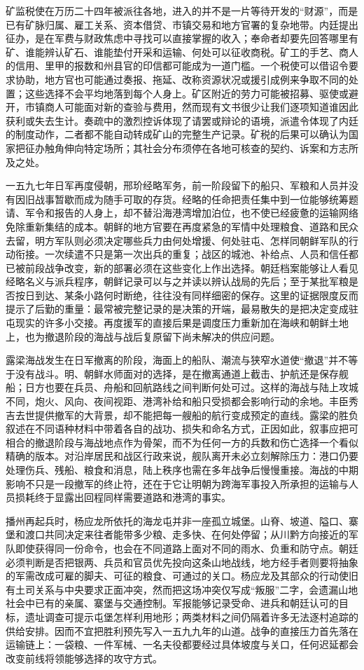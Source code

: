 矿监税使在万历二十四年被派往各地，进入的并不是一片等待开发的“财源”，而是已有矿脉归属、雇工关系、资本借贷、市镇交易和地方官署的复杂地带。内廷提出征办，是在军费与财政焦虑中寻找可以直接掌握的收入；奉命者却要先回答哪里有矿、谁能辨认矿石、谁能垫付开采和运输、何处可以征收商税。矿工的手艺、商人的信用、里甲的报数和州县官的印信都可能成为一道门槛。一个税使可以借诏令要求协助，地方官也可能通过奏报、拖延、改称资源状况或援引成例来争取不同的处置；这些选择不会平均地落到每个人身上。矿区附近的劳力可能被招募、驱使或避开，市镇商人可能面对新的查验与费用，然而现有文书很少让我们逐项知道谁因此获利或失去生计。奏疏中的激烈控诉体现了请罢或辩论的语境，派遣令体现了内廷的制度动作，二者都不能自动转成矿山的完整生产记录。矿税的后果可以确认为国家把征办触角伸向特定场所；其社会分布须停在各地可核查的契约、诉案和方志所及之处。

一五九七年日军再度侵朝，邢玠经略军务，前一阶段留下的船只、军粮和人员并没有因旧战事暂歇而成为随手可取的存货。经略的任命把责任集中到一位能够统筹题请、军令和报告的人身上，却不替沿海港湾增加泊位，也不使已经疲惫的运输网络免除重新集结的成本。朝鲜的地方官要在再度紧急的军情中处理粮食、道路和民众去留，明方军队则必须决定哪些兵力由何处增援、何处驻屯、怎样同朝鲜军队的行动衔接。一次续遣不只是第一次出兵的重复；战区的城池、补给点、人员和信任都已被前段战争改变，新的部署必须在这些变化上作出选择。朝廷档案能够让人看见经略名义与派兵程序，朝鲜记录可以与之并读以辨认战局的先后；至于某批军粮是否按日到达、某条小路何时断绝，往往没有同样细密的保存。这里的证据限度反而提示了后勤的重量：最常被完整记录的是决策的开端，最易散失的是把决定变成驻屯现实的许多小交接。再度援军的直接后果是调度压力重新加在海峡和朝鲜土地上，也为撤退阶段的海战与战后复原留下尚未解决的供应问题。

露梁海战发生在日军撤离的阶段，海面上的船队、潮流与狭窄水道使“撤退”并不等于没有战斗。明、朝鲜水师面对的选择，是在撤离通道上截击、护航还是保存舰船；日方也要在兵员、舟船和回航路线之间判断何处可过。这样的海战与陆上攻城不同，炮火、风向、夜间视距、港湾补给和船只受损都会影响行动的余地。丰臣秀吉去世提供撤军的大背景，却不能把每一艘船的航行变成预定的直线。露梁的胜负叙述在不同语种材料中带着各自的战功、损失和命名方式，正因如此，叙事应把可相合的撤退阶段与海战地点作为骨架，而不为任何一方的兵数和伤亡选择一个看似精确的版本。对沿岸居民和战区行政来说，舰队离开未必立刻解除压力：港口仍要处理伤兵、残船、粮食和消息，陆上秩序也需在多年战争后慢慢重接。海战的中期影响不只是一段撤军的终止符，还在于它让明朝为跨海军事投入所承担的运输与人员损耗终于显露出回程同样需要道路和港湾的事实。

播州再起兵时，杨应龙所依托的海龙屯并非一座孤立城堡。山脊、坡道、隘口、寨堡和渡口共同决定来往者能带多少粮、走多快、在何处停留；从川黔方向接近的军队即使获得同一份命令，也会在不同道路上面对不同的雨水、负重和防守点。朝廷必须判断是否把银两、兵员和官员优先投向这条山地战线，地方经手者则要将抽象的军需改成可雇的脚夫、可征的粮食、可通过的关口。杨应龙及其部众的行动使旧有土司关系与中央要求正面冲突，然而把这场冲突仅写成“叛服”二字，会遗漏山地社会中已有的亲属、寨堡与交通控制。军报能够记录受命、进兵和朝廷认可的目标，遗址调查可提示屯堡怎样利用地形；两类材料之间仍隔着许多无法逐村追踪的供给安排。因而不宜把胜利预先写入一五九九年的山道。战争的直接压力首先落在运输链上：一袋粮、一件军械、一名夫役都要经过具体坡度与关口，任何迟延都会改变前线将领能够选择的攻守方式。

